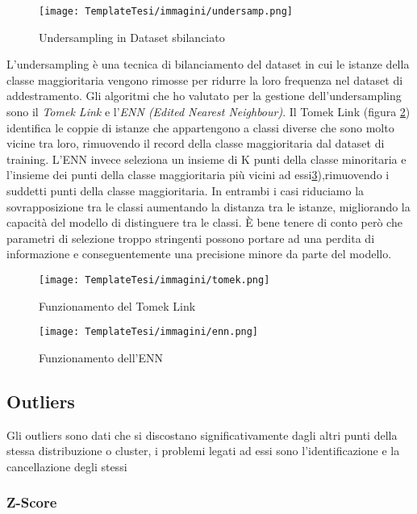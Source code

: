 \begin{flushleft}
\begin{figure}[H]
    \centering
    \texttt{[image: TemplateTesi/immagini/undersamp.png]}
    \caption{Undersampling in Dataset sbilanciato  \cite{ImmOverUnderSampling}}
    \label{fig:my_label}
\end{figure}
L'undersampling è una tecnica di bilanciamento del dataset in cui le istanze della classe maggioritaria vengono rimosse per ridurre la loro frequenza nel dataset di addestramento.
Gli algoritmi che ho valutato per la gestione dell'undersampling sono il \emph{Tomek Link} e l'\emph{ENN (Edited Nearest Neighbour)}.
Il Tomek Link (figura \ref{fig:tomek}) identifica le coppie di istanze che appartengono a classi diverse che sono molto vicine tra loro, rimuovendo il record della classe maggioritaria dal dataset di training.
L'ENN invece seleziona un insieme di K punti della classe minoritaria e l'insieme dei punti della classe maggioritaria più vicini ad essi\ref{fig:enn}),rimuovendo i suddetti punti della classe maggioritaria.
In entrambi i casi riduciamo la sovrapposizione tra le classi aumentando la distanza tra le istanze, migliorando la capacità del modello di distinguere tra le classi.
È bene tenere di conto però che parametri di selezione troppo stringenti possono portare ad una perdita di informazione e conseguentemente una precisione minore da parte del modello.

\begin{figure}[H]
    \centering
    \texttt{[image: TemplateTesi/immagini/tomek.png]}
    \caption{Funzionamento del Tomek Link \cite{ImmTOmekLink}}
    \label{fig:tomek}
\end{figure}


\begin{figure}[H]   
    \centering
    \texttt{[image: TemplateTesi/immagini/enn.png]}
    \caption{Funzionamento dell'ENN \cite{ImmENN}}
    \label{fig:enn}
\end{figure}


\subsection{Outliers}
Gli outliers sono dati che si discostano significativamente dagli altri punti della stessa distribuzione o cluster, i problemi legati ad essi sono l’identificazione e la cancellazione degli stessi

\subsubsection{Z-Score}


\end{flushleft}
